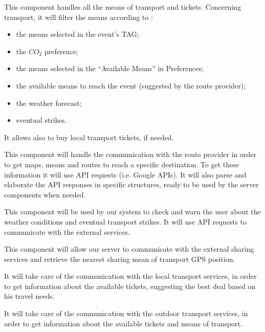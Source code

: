 This component handles all the means of transport and tickets. Concerning transport, it will filter the means according to :
\begin{itemize}
	\setlength{\leftskip}{1cm}
	\item the means selected in the event’s TAG;
	\item the $CO_2$ preference;
	\item the means selected in the “Available Means” in Preferences;
	\item the available means to reach the event (suggested by the route provider);
	\item the weather forecast;
	\item eventual strikes.
\end{itemize}
It allows also to buy local transport tickets, if needed. 

This component will handle the communication with the route provider in order to get maps, means and routes to reach a specific destination. To get these information it will use API requests (i.e. Google APIs).
It will also parse and elaborate the API responses in specific structures, ready to be used by the server components when needed.

This component will be used by our system to check and warn the user about the weather conditions and eventual transport strikes.
It will use API requests to communicate with the external services.

This component will allow our server to communicate with the external sharing services and retrieve the nearest sharing mean of transport GPS position.

It will take care of the communication with the local transport services, in order to get information about the available tickets, suggesting the best deal based on his travel needs.

It will take care of the communication with the outdoor transport services, in order to get information about the available tickets and means of transport.

